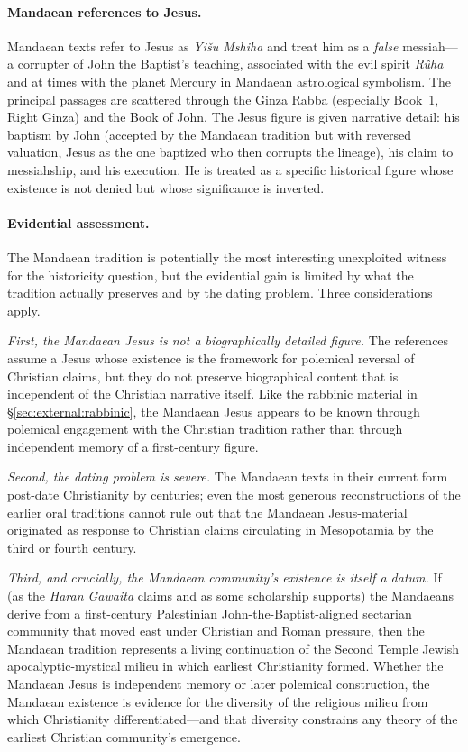 \documentclass[12pt,oneside]{article}
\newcommand{\grk}[1]{\textit{#1}}   %
\begin{document}
\paragraph{Mandaean references to Jesus.}
Mandaean texts refer to Jesus as \grk{Yi\v{s}u Mshiha} and treat him
as a \textit{false} messiah---a corrupter of John the Baptist's
teaching, associated with the evil spirit \grk{R\^uha} and at times
with the planet Mercury in Mandaean astrological symbolism.  The
principal passages are scattered through the Ginza Rabba
(especially Book~1, Right Ginza) and the Book of John.  The Jesus
figure is given narrative detail: his baptism by John (accepted by
the Mandaean tradition but with reversed valuation, Jesus as the
one baptized who then corrupts the lineage), his claim to
messiahship, and his execution.  He is treated as a specific
historical figure whose existence is not denied but whose
significance is inverted.

\paragraph{Evidential assessment.}
The Mandaean tradition is potentially the most interesting
unexploited witness for the historicity question, but the
evidential gain is limited by what the tradition actually preserves
and by the dating problem.  Three considerations apply.

\textit{First, the Mandaean Jesus is not a biographically detailed
figure.}  The references assume a Jesus whose existence is the
framework for polemical reversal of Christian claims, but they do
not preserve biographical content that is independent of the
Christian narrative itself.  Like the rabbinic material in
§\ref{sec:external:rabbinic}, the Mandaean Jesus appears to be
known through polemical engagement with the Christian tradition
rather than through independent memory of a first-century figure.

\textit{Second, the dating problem is severe.}  The Mandaean texts
in their current form post-date Christianity by centuries; even the
most generous reconstructions of the earlier oral traditions
cannot rule out that the Mandaean Jesus-material originated as
response to Christian claims circulating in Mesopotamia by the
third or fourth century.

\textit{Third, and crucially, the Mandaean community's existence
is itself a datum.}  If (as the \textit{Haran Gawaita} claims and
as some scholarship supports) the Mandaeans derive from a
first-century Palestinian John-the-Baptist-aligned sectarian
community that moved east under Christian and Roman pressure,
then the Mandaean tradition represents a living continuation of
the Second Temple Jewish apocalyptic-mystical milieu in which
earliest Christianity formed.  Whether the Mandaean Jesus is
independent memory or later polemical construction, the Mandaean
existence is evidence for the diversity of the religious milieu
from which Christianity differentiated---and that diversity
constrains any theory of the earliest Christian community's
emergence.
\end{document}
